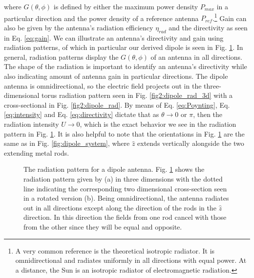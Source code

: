 \documentclass[10pt]{article}
\begin{document}
where $G(\theta,\phi)$ is defined by either the maximum power density $P_{max}$ in a particular direction and the power density of a reference antenna $P_{ref}$.\footnote{A very common reference is the theoretical isotropic radiator. It is omnidirectional and radiates uniformly in all directions with equal power\cite{Balanis_2005}\cite{schelkunoff1952antennas}. At a distance, the Sun is an isotropic radiator of electromagnetic radiation.} Gain can also be given by the antenna's radiation efficiency $\eta_{rad}$ and the directivity as seen in Eq. \ref{eq:gain}. We can illustrate an antenna's directivity and gain using radiation patterns, of which in particular our derived dipole is seen in Fig. \ref{fig:dipole_radiation}. In general, radiation patterns display the $G(\theta,\phi)$ of an antenna in all directions. The shape of the radiation is important to identify an antenna's directivity while also indicating amount of antenna gain in particular directions. The dipole antenna is omnidirectional, so the electric field projects out in the three-dimensional torus radiation pattern seen in Fig. \ref{fig2:dipole_rad_3d} with a cross-sectional in Fig. \ref{fig2:dipole_rad}. By means of Eq. \ref{eq:Poynting}, Eq. \ref{eq:intensity} and Eq. \ref{eq:directivity} dictate that as $\theta \rightarrow 0$ or $\pi$, then the radiation intensity $U \rightarrow 0$, which is the exact behavior we see in the radiation pattern in Fig. \ref{fig:dipole_radiation}. It is also helpful to note that the orientations in Fig. \ref{fig:dipole_radiation} are the same as in Fig. \ref{fig:dipole_system}, where $\hat{z}$ extends vertically alongside the two extending metal rods.

\begin{figure}[htp]
    \hspace*{\fill}%
    \hfill%
    \hspace*{\fill}%

    \bigskip
    
\caption{The radiation pattern for a dipole antenna. Fig. \ref{fig:dipole_radiation} shows the radiation pattern given by (a) in three dimensions with the dotted line indicating the corresponding two dimensional cross-section seen in a rotated version (b). Being omnidirectional, the antenna radiates out in all directions except along the direction of the rods in the $\hat{z}$ direction. In this direction the fields from one rod cancel with those from the other since they will be equal and opposite\cite{dipole_radiation}.}

\label{fig:dipole_radiation}
\end{figure}
\end{document}
